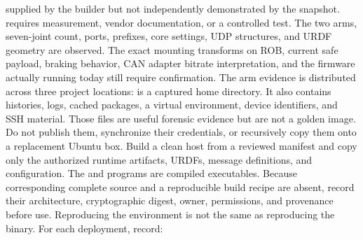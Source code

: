 \markdownRendererUlItem {} supplied by the builder but not independently demonstrated by the snapshot.\markdownRendererUlItemEnd 
\markdownRendererUlItem {} requires measurement, vendor documentation, or a controlled test.\markdownRendererUlItemEnd 
\markdownRendererUlEnd \markdownRendererInterblockSeparator
{}The two arms, seven-joint count, ports, prefixes, core settings, UDP structures, and URDF geometry are observed. The exact mounting transforms on ROB, current safe payload, braking behavior, CAN adapter bitrate interpretation, and the firmware actually running today still require confirmation.\markdownRendererInterblockSeparator
{}
\markdownRendererSectionEnd 
\markdownRendererSectionEnd \markdownRendererSectionBegin
{}\markdownRendererInterblockSeparator
{}The arm evidence is distributed across three project locations:\markdownRendererInterblockSeparator
{}\markdownRendererInterblockSeparator
{} is a captured home directory. It also contains histories, logs, cached packages, a virtual environment, device identifiers, and SSH material. Those files are useful forensic evidence but are not a golden image. Do not publish them, synchronize their credentials, or recursively copy them onto a replacement Ubuntu box. Build a clean host from a reviewed manifest and copy only the authorized runtime artifacts, URDFs, message definitions, and configuration.\markdownRendererParagraphSeparator
{}The  and  programs are compiled executables. Because corresponding complete source and a reproducible build recipe are absent, record their architecture, cryptographic digest, owner, permissions, and provenance before use. Reproducing the environment is not the same as reproducing the binary.\markdownRendererInterblockSeparator
{}\markdownRendererSectionBegin
{}\markdownRendererInterblockSeparator
{}For each deployment, record:\markdownRendererInterblockSeparator
{}\markdownRendererInterblockSeparator

